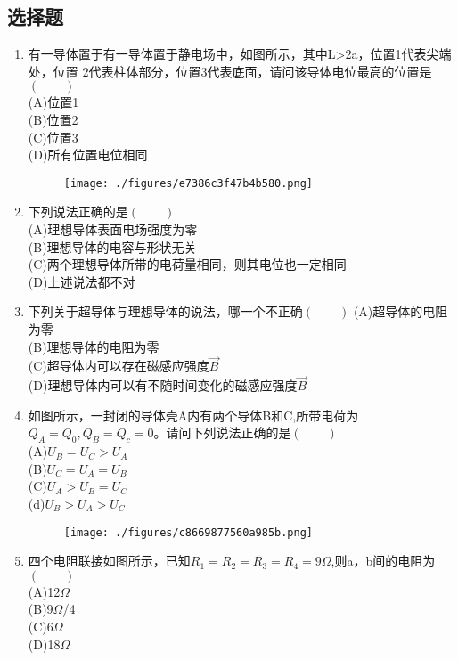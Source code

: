 \subsection{选择题}
\begin{enumerate}
\item 有一导体置于有一导体置于静电场中，如图所示，其中L>2a，位置1代表尖端处，位置 2代表柱体部分，位置3代表底面，请问该导体电位最高的位置是$(\qquad)$\\
(A)位置1\\
(B)位置2\\
(C)位置3\\
(D)所有位置电位相同
\begin{figure}[ht]
\centering
\texttt{[image: ./figures/e7386c3f47b4b580.png]}
\caption{} \label{fig_CD09_2}
\end{figure}
\item 下列说法正确的是$(\qquad)$\\
(A)理想导体表面电场强度为零\\
(B)理想导体的电容与形状无关\\
(C)两个理想导体所带的电荷量相同，则其电位也一定相同\\
(D)上述说法都不对
\item 下列关于超导体与理想导体的说法，哪一个不正确$(\qquad)$
(A)超导体的电阻为零\\
(B)理想导体的电阻为零\\
(C)超导体内可以存在磁感应强度$\vec B$\\
(D)理想导体内可以有不随时间变化的磁感应强度$\vec B$
\item 如图所示，一封闭的导体壳A内有两个导体B和C,所带电荷为$Q_A=Q_0,Q_B=Q_c=0$。请问下列说法正确的是$(\qquad)$\\
(A)$U_B=U_C>U_A$\\
(B)$U_C=U_A=U_B$\\
(C)$U_A>U_B=U_C$\\
(d)$U_B>U_A>U_C$
\begin{figure}[ht]
\centering
\texttt{[image: ./figures/c8669877560a985b.png]}
\caption{} \label{fig_CD09_3}
\end{figure}
\item 四个电阻联接如图所示，已知$R_1=R_2=R_3=R_4=9\Omega$,则a，b间的电阻为$(\qquad)$\\
(A)12$\Omega$\\
(B)9$\Omega$/4\\
(C)6$\Omega$\\
(D)18$\Omega$
\begin{figure}[ht]
\centering

\end{figure}
\end{enumerate}
